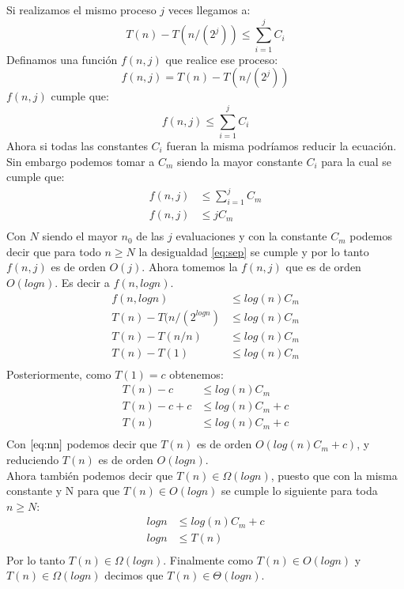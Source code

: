 \documentclass[12pt]{article}
\begin{document}
Si realizamos el mismo proceso $j$ veces llegamos a:
\begin{equation}\label{eq:frth}
T(n)-T(n/(2^j)) \leq \sum_{i=1}^{j}{C_i}
\end{equation}
Definamos una función $f(n,j)$ que realice ese proceso:
\begin{equation}\label{eq:ffth}
f(n,j) = T(n)-T(n/(2^j))
\end{equation}
$f(n,j)$ cumple que:
\begin{equation}\label{eq:sxth}
f(n,j) \leq \sum_{i=1}^{j}{C_i}
\end{equation}
Ahora si todas las constantes $C_i$ fueran la misma podríamos reducir la ecuación. Sin embargo podemos tomar a $C_m$ siendo la mayor constante $C_i$ para la cual se cumple que:
\begin{equation}\label{eq:sep}
\begin{split}
f(n,j) & \leq \sum_{i=1}^{j}{C_m} \\
f(n,j) & \leq jC_m \\
\end{split}
\end{equation}
Con $N$ siendo el mayor $n_0$ de las $j$ evaluaciones y con la constante $C_m$ podemos decir que para todo $n\geq N$ la desigualdad \eqref{eq:sep} se cumple y por lo tanto $f(n,j)$ es de orden $O(j)$.
Ahora tomemos la $f(n,j)$ que es de orden $O(logn)$. Es decir a $f(n,logn)$.
\begin{equation}\label{eq:oct}
\begin{split}
f(n,logn) & \leq log(n)C_m \\
T(n)-T(n/(2^{logn}) & \leq log(n)C_m\\
T(n)-T(n/n) & \leq log(n)C_m\\
T(n)-T(1) & \leq log(n)C_m\\
\end{split}
\end{equation}
Posteriormente, como $T(1)=c$ obtenemos:
\begin{equation}\label{eq:nn}
\begin{split}
T(n)-c & \leq log(n)C_m\\
T(n)-c+c& \leq log(n)C_m +c\\
T(n) & \leq log(n)C_m + c\\
\end{split}
\end{equation}
Con $\eqref{eq:nn}$ podemos decir que $T(n)$ es de orden $O(log(n)C_m + c)$, y reduciendo $T(n)$ es de orden $O(logn)$.\\
Ahora también podemos decir que $T(n) \in \Omega(logn)$, puesto que con la misma constante y N para que $T(n)\in O(logn)$ se cumple lo siguiente para toda $n\geq N$:
\begin{equation}\label{eq:dz}
\begin{split}
logn & \leq log(n)C_m + c \\
logn & \leq T(n) \\
\end{split}
\end{equation}
Por lo tanto $T(n)\in \Omega(logn)$.
Finalmente como $T(n) \in O(logn)$ y $T(n)\in \Omega(logn)$ decimos que $T(n) \in \Theta(logn)$.
\end{document}
